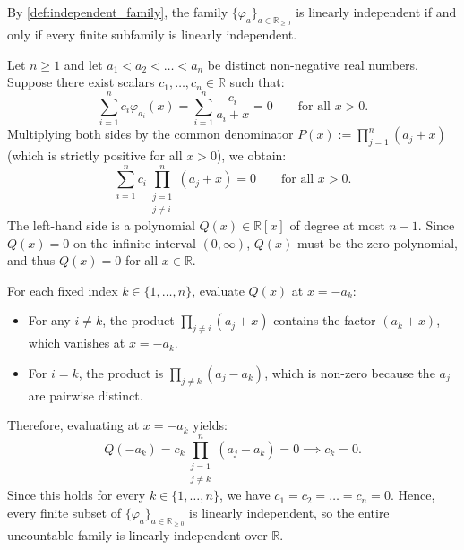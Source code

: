 \begin{exercisesolution}
\label{sol:rational_functions_independent}
By \cref{def:independent_family}, the family $\{\varphi_a\}_{a \in \mathbb{R}_{\ge 0}}$ is linearly independent if and only if every finite subfamily is linearly independent.

Let $n \ge 1$ and let $a_1 < a_2 < \dots < a_n$ be distinct non-negative real numbers. Suppose there exist scalars $c_1, \dots, c_n \in \mathbb{R}$ such that:
\[
\sum_{i=1}^{n} c_i \varphi_{a_i}(x) = \sum_{i=1}^{n} \frac{c_i}{a_i + x} = 0 \qquad \text{for all } x > 0.
\]
Multiplying both sides by the common denominator $P(x) := \prod_{j=1}^n (a_j + x)$ (which is strictly positive for all $x > 0$), we obtain:
\[
\sum_{i=1}^{n} c_i \prod_{\substack{j=1 \\ j \ne i}}^{n} (a_j + x) = 0 \qquad \text{for all } x > 0.
\]
The left-hand side is a polynomial $Q(x) \in \mathbb{R}[x]$ of degree at most $n-1$. Since $Q(x) = 0$ on the infinite interval $(0, \infty)$, $Q(x)$ must be the zero polynomial, and thus $Q(x) = 0$ for all $x \in \mathbb{R}$.

For each fixed index $k \in \{1, \dots, n\}$, evaluate $Q(x)$ at $x = -a_k$:
\begin{itemize}
    \item For any $i \ne k$, the product $\prod_{j \ne i} (a_j + x)$ contains the factor $(a_k + x)$, which vanishes at $x = -a_k$.
    \item For $i = k$, the product is $\prod_{j \ne k} (a_j - a_k)$, which is non-zero because the $a_j$ are pairwise distinct.
\end{itemize}
Therefore, evaluating at $x = -a_k$ yields:
\[
Q(-a_k) = c_k \prod_{\substack{j=1 \\ j \ne k}}^{n} (a_j - a_k) = 0 \implies c_k = 0.
\]
Since this holds for every $k \in \{1, \dots, n\}$, we have $c_1 = c_2 = \dots = c_n = 0$.
Hence, every finite subset of $\{\varphi_a\}_{a \in \mathbb{R}_{\ge 0}}$ is linearly independent, so the entire uncountable family is linearly independent over $\mathbb{R}$.
\end{exercisesolution}

